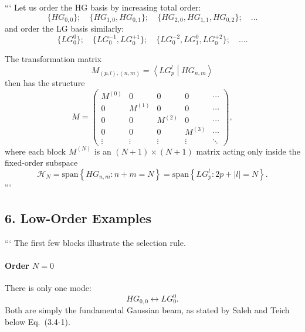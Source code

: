 \begin{resolucao}[Solution]
```
Let us order the HG basis by increasing total order:
\begin{equation}
    \{HG_{0,0}\};
    \quad
    \{HG_{1,0},HG_{0,1}\};
    \quad
    \{HG_{2,0},HG_{1,1},HG_{0,2}\};
    \quad
    \ldots
\end{equation}
and order the LG basis similarly:
\begin{equation}
    \{LG_0^0\};
    \quad
    \{LG_0^{-1},LG_0^{+1}\};
    \quad
    \{LG_0^{-2},LG_1^0,LG_0^{+2}\};
    \quad
    \ldots.
\end{equation}

The transformation matrix
\begin{equation}
    M_{(p,l),(n,m)}
    =
    \left\langle
    LG_p^l
    \middle|
    HG_{n,m}
    \right\rangle
    \label{eq:transformation_matrix}
\end{equation}
then has the structure
\begin{equation}
    M
    =
    \begin{pmatrix}
        M^{(0)} & 0 & 0 & 0 & \cdots \\
        0 & M^{(1)} & 0 & 0 & \cdots \\
        0 & 0 & M^{(2)} & 0 & \cdots \\
        0 & 0 & 0 & M^{(3)} & \cdots \\
        \vdots & \vdots & \vdots & \vdots & \ddots
    \end{pmatrix},
    \label{eq:block_diagonal_matrix}
\end{equation}
where each block $M^{(N)}$ is an $(N+1)\times(N+1)$ matrix acting only inside the fixed-order subspace
\begin{equation}
    \mathcal H_N
    =
    \mathrm{span}
    \left\{
        HG_{n,m}: n+m=N
    \right\}
    =
    \mathrm{span}
    \left\{
        LG_p^l: 2p+|l|=N
    \right\}.
    \label{eq:same_subspace}
\end{equation}
```

\subsection*{6. Low-Order Examples}

```
The first few blocks illustrate the selection rule.

\paragraph*{Order $N=0$}
There is only one mode:
\begin{equation}
    HG_{0,0}
    \leftrightarrow
    LG_0^0.
\end{equation}
Both are simply the fundamental Gaussian beam, as stated by Saleh and Teich below Eq.~(3.4-1).


\end{resolucao}
